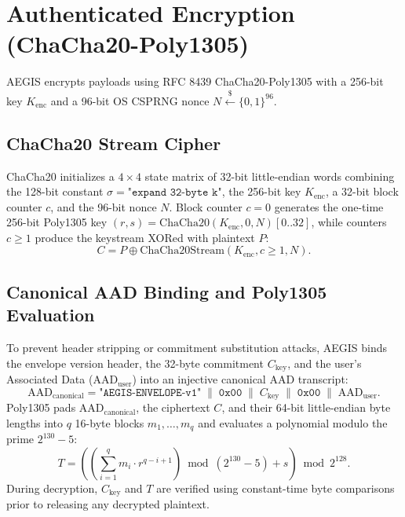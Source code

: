 \documentclass[11pt,a4paper]{article}
\theoremstyle{definition}
\newcommand{\concat}{\;\|\;}
\begin{document}
\section{Authenticated Encryption (ChaCha20-Poly1305)}

AEGIS encrypts payloads using RFC 8439 ChaCha20-Poly1305 with a 256-bit key $K_{\mathrm{enc}}$ and a 96-bit OS CSPRNG nonce $N \xleftarrow{\$} \{0,1\}^{96}$.

\subsection{ChaCha20 Stream Cipher}
ChaCha20 initializes a $4 \times 4$ state matrix of 32-bit little-endian words combining the 128-bit constant $\sigma = \texttt{"expand 32-byte k"}$, the 256-bit key $K_{\mathrm{enc}}$, a 32-bit block counter $c$, and the 96-bit nonce $N$. Block counter $c = 0$ generates the one-time 256-bit Poly1305 key $(r, s) = \mathrm{ChaCha20}(K_{\mathrm{enc}}, 0, N)[0..32]$, while counters $c \ge 1$ produce the keystream XORed with plaintext $P$:
\begin{equation}
    C = P \oplus \mathrm{ChaCha20Stream}(K_{\mathrm{enc}}, c \ge 1, N).
\end{equation}

\subsection{Canonical AAD Binding and Poly1305 Evaluation}
To prevent header stripping or commitment substitution attacks, AEGIS binds the envelope version header, the 32-byte commitment $C_{\mathrm{key}}$, and the user's Associated Data ($\mathrm{AAD}_{\mathrm{user}}$) into an injective canonical AAD transcript:
\begin{equation}
    \mathrm{AAD}_{\mathrm{canonical}} = \texttt{"AEGIS-ENVELOPE-v1"} \concat \texttt{0x00} \concat C_{\mathrm{key}} \concat \texttt{0x00} \concat \mathrm{AAD}_{\mathrm{user}}.
\end{equation}
Poly1305 pads $\mathrm{AAD}_{\mathrm{canonical}}$, the ciphertext $C$, and their 64-bit little-endian byte lengths into $q$ 16-byte blocks $m_1, \dots, m_q$ and evaluates a polynomial modulo the prime $2^{130}-5$:
\begin{equation}
    T = \left( \left( \sum_{i=1}^{q} m_i \cdot r^{q - i + 1} \right) \bmod (2^{130} - 5) + s \right) \bmod 2^{128}.
\end{equation}
During decryption, $C_{\mathrm{key}}$ and $T$ are verified using constant-time byte comparisons prior to releasing any decrypted plaintext.
\end{document}
